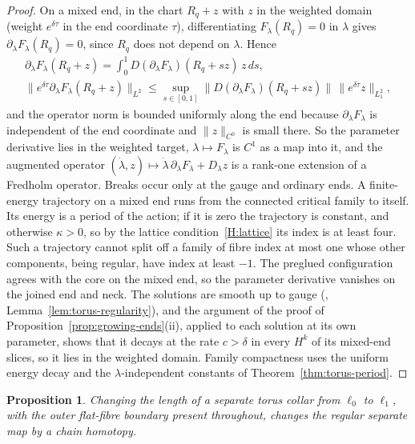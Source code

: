 \documentclass[11pt]{amsart}
\newtheorem{proposition}[theorem]{Proposition}
\theoremstyle{definition}
\theoremstyle{remark}
\theoremstyle{plain}
\numberwithin{equation}{section}
\begin{document}
\begin{proof}
On a mixed end, in the chart $R_q+z$ with $z$ in the weighted domain (weight
$e^{\delta\tau}$ in the end coordinate $\tau$), differentiating $F_\lambda(R_q)=0$ in
$\lambda$ gives $\partial_\lambda F_\lambda(R_q)=0$, since $R_q$ does not depend on $\lambda$. Hence
\begin{gather*}
\partial_\lambda F_\lambda(R_q+z)=\int_0^1D(\partial_\lambda F_\lambda)(R_q+sz)\,z\,ds,\\
\|e^{\delta\tau}\partial_\lambda F_\lambda(R_q+z)\|_{L^2}\le
\sup_{s\in[0,1]}\|D(\partial_\lambda F_\lambda)(R_q+sz)\|\,\|e^{\delta\tau}z\|_{L^2_1},
\end{gather*}
and the operator norm is bounded uniformly along the end because $\partial_\lambda F_\lambda$ is
independent of the end coordinate and $\|z\|_{C^0}$ is small there. So the parameter
derivative lies in the weighted target, $\lambda\mapsto F_\lambda$ is $C^1$ as a map into it, and
the augmented operator $(\dot\lambda,z)\mapsto\dot\lambda\,\partial_\lambda F_\lambda+D_\lambda z$ is a
rank-one extension of a Fredholm operator. Breaks occur only at the gauge and
ordinary ends. A finite-energy trajectory on a mixed end runs from the connected
critical family to itself. Its energy is a period of the action; if it is zero the
trajectory is constant, and otherwise $\kappa>0$, so by the lattice
condition~\ref{H:lattice} its index is at least four. Such a trajectory cannot split off a
family of fibre index at most one whose other components, being regular, have index at
least $-1$. The preglued configuration agrees with the
core on the mixed end, so the parameter derivative vanishes on the joined end and neck.
The solutions are smooth up to gauge (\cite[Proposition~3.6]{DFL},
Lemma~\ref{lem:torus-regularity}), and the argument of the proof of
Proposition~\ref{prop:growing-ends}(ii), applied to each solution at its own parameter, shows
that it decays at the rate $c>\delta$ in every $H^k$ of its mixed-end slices, so it lies in the
weighted domain. Family compactness uses the uniform energy decay and the $\lambda$-independent
constants of Theorem~\ref{thm:torus-period}.
\end{proof}

\begin{proposition}\label{prop:collar-length}
Changing the length of a separate torus collar from $\ell_0$ to $\ell_1$, with the
outer flat-fibre boundary present throughout, changes the regular separate map
by a chain homotopy.
\end{proposition}
\end{document}
